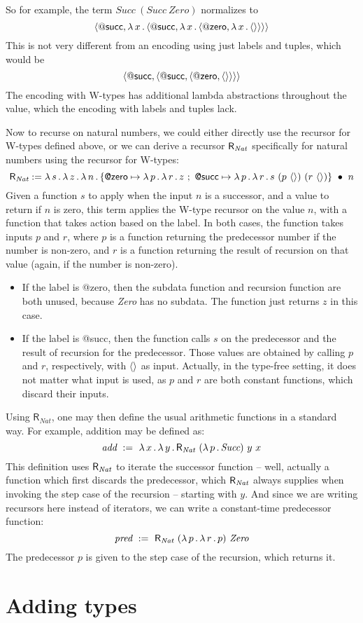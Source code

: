 \documentclass{article}
\begin{document}
\noindent So for example, the term $\textit{Succ}\ (\textit{Succ}\ \textit{Zero})$
normalizes to
\[
\langle \mathsf{@succ} , \lambda\, x\, .\, \langle \mathsf{@succ} , \lambda\, x\, .\, \langle \mathsf{@zero} , \lambda\, x\, .\, \langle\rangle \rangle \rangle \rangle
\]
\noindent This is not very different from an encoding using just labels and tuples, which would
be
\[
\langle \mathsf{@succ} , \langle \mathsf{@succ} , \langle \mathsf{@zero} , \langle\rangle \rangle \rangle \rangle
\]
\noindent The encoding with W-types has additional lambda abstractions throughout the value, which
the encoding with labels and tuples lack.

Now to recurse on natural numbers, we could either directly use the recursor for W-types defined above,
or we can derive a recursor $\mathsf{R}_{\textit{Nat}}$ specifically for natural numbers using the recursor for W-types:
\[
\rrec := \lam{s}{\lam{z}{\lam{n}{\wrec{\{\textsf{@zero} \mapsto \lam{p}{\lam{r}{z}}\ ;\ \textsf{@succ} \mapsto \lam{p}{\lam{r}{s\ (p\ \wunit)\ (r\ \wunit)}}\}}{n}}}}
\]
\noindent Given a function $s$ to apply when the input $n$ is a successor, and a value to return if $n$ is zero, this
term applies the W-type recursor on the value $n$, with a function that takes action based on the label.  In both
cases, the function takes inputs $p$ and $r$, where $p$ is a function returning the predecessor number if the number is non-zero, and
$r$ is a function returning the result of recursion on that value (again, if the number is non-zero).
\begin{itemize}
\item If the label is \textsf{@zero}, then the subdata function and recursion function are both unused, because
  \textit{Zero} has no subdata.  The function just
    returns $z$ in this case.
  \item If the label is \textsf{@succ}, then the function calls $s$ on
    the predecessor and the result of recursion for the predecessor.
    Those values are obtained by calling $p$ and $r$, respectively,
    with $\langle\rangle$ as input.  Actually, in the type-free setting, it
    does not matter what input is used, as $p$ and $r$ are both
    constant functions, which discard their inputs.
\end{itemize}

Using $\mathsf{R}_{\textit{Nat}}$, one may then define the usual arithmetic functions in a standard way.  For example, addition may be defined as:
\[
\textit{add}\ :=\ \lam{x}{\lam{y}{\rrec\ (\lam{p}{\textit{Succ}})\ y\ x}}
\]
\noindent This definition uses $\mathsf{R}_{\textit{Nat}}$ to iterate the successor function -- well, actually a function which first discards the predecessor,
which $\mathsf{R}_{\textit{Nat}}$ always supplies when invoking the step case of the recursion -- starting with $y$.  And since we are writing recursors here
instead of iterators, we can write a constant-time predecessor function:
\[
\textit{pred}\ :=\ \rrec\ (\lam{p}{\lam{r}{p}})\ \textit{Zero}
\]
\noindent The predecessor $p$ is given to the step case of the recursion, which returns it.

\section{Adding types}



\end{document}
